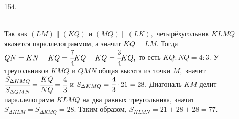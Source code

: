 154. \begin{figure}[ht!]
\end{figure}\\
Так как $(LM)\parallel (KQ)$ и $(MQ)\parallel(LK),$ четырёхугольник $KLMQ$ является параллелограммом, а значит $KQ=LM.$ Тогда $QN=KN-KQ=\cfrac{7}{4}KQ-KQ=\cfrac{3}{4}KQ,$ то есть $KQ:NQ=4:3.$ У треугольников $KMQ$ и $QMN$ общая высота из точки $M,$ значит $\cfrac{S_{\Delta KMQ}}{S_{\Delta QMN}}=\cfrac{KQ}{NQ}=\cfrac{4}{3}$ и $S_{\Delta KMQ}=\cfrac{4}{3}\cdot21=28.$ Диагональ $KM$ делит параллелограмм $KLMQ$ на два равных треугольника, значит $S_{\Delta KLM}=S_{\Delta KMQ}=28.$ Таким образом, $S_{KLMN}=21+28+28=77.$\\
